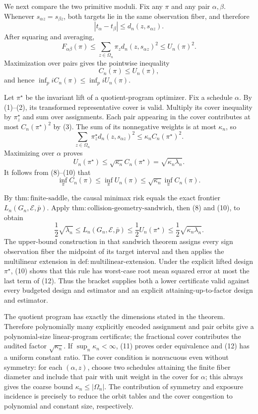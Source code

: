 We next compare the two primitive moduli. Fix any \(\pi\) and any pair \(\alpha,\beta\). Whenever \(s_{\alpha z}=s_{\beta z}\), both targets lie in the same observation fiber, and therefore
\[
 |t_\alpha-t_\beta|
 \le d_n(z,s_{\alpha z}).
\]
After squaring and averaging,
\[
 F_{\alpha\beta}(\pi)
 \le\sum_{z\in\Omega_n}\pi_zd_n(z,s_{\alpha z})^2
 \le U_n(\pi)^2.
\]
Maximization over pairs gives the pointwise inequality
\[
 C_n(\pi)\le U_n(\pi), \tag{9}
\]
and hence \(\inf_pi C_n(\pi)\le\inf_pi U_n(\pi)\).

Let \(\pi^\star\) be the invariant lift of a quotient-program optimizer. Fix a schedule \(\alpha\). By (1)--(2), its transformed representative cover is valid. Multiply its cover inequality by \(\pi_z^\star\) and sum over assignments. Each pair appearing in the cover contributes at most \(C_n(\pi^\star)^2\) by (3). The sum of its nonnegative weights is at most \(\kappa_n\), so
\[
 \sum_{z\in\Omega_n}\pi_z^\star d_n(z,s_{\alpha z})^2
 \le\kappa_n C_n(\pi^\star)^2.
\]
Maximizing over \(\alpha\) proves
\[
 U_n(\pi^\star)
 \le\sqrt{\kappa_n}C_n(\pi^\star)
 =\sqrt{\kappa_n\lambda_n}. \tag{10}
\]
It follows from (8)--(10) that
\[
 \inf_\pi C_n(\pi)
 \le\inf_\pi U_n(\pi)
 \le\sqrt{\kappa_n}\inf_\pi C_n(\pi). \tag{11}
\]

By \(\mathrm{thm{:}finite\text{-}saddle}\), the causal minimax risk equals the exact frontier \(L_n(G_n,\mathcal E,\bar p)\). Apply \(\mathrm{thm{:}collision\text{-}geometry\text{-}sandwich}\), then (8) and (10), to obtain
\[
 \frac12\sqrt{\lambda_n}
 \le L_n(G_n,\mathcal E,\bar p)
 \le\frac12U_n(\pi^\star)
 \le\frac12\sqrt{\kappa_n\lambda_n}. \tag{12}
\]
The upper-bound construction in that sandwich theorem assigns every sign observation fiber the midpoint of its target interval and then applies the multilinear extension in \(\mathrm{def{:}multilinear\text{-}extension}\). Under the explicit lifted design \(\pi^\star\), (10) shows that this rule has worst-case root mean squared error at most the last term of (12). Thus the bracket supplies both a lower certificate valid against every budgeted design and estimator and an explicit attaining-up-to-factor design and estimator.

The quotient program has exactly the dimensions stated in the theorem. Therefore polynomially many explicitly encoded assignment and pair orbits give a polynomial-size linear-program certificate; the fractional cover contributes the audited factor \(\sqrt{\kappa_n}\). If \(\sup_n\kappa_n<\infty\), (11) proves order equivalence and (12) has a uniform constant ratio. The cover condition is nonvacuous even without symmetry: for each \((\alpha,z)\), choose two schedules attaining the finite fiber diameter and include that pair with unit weight in the cover for \(\alpha\); this always gives the coarse bound \(\kappa_n\le|\Omega_n|\). The contribution of symmetry and exposure incidence is precisely to reduce the orbit tables and the cover congestion to polynomial and constant size, respectively.

